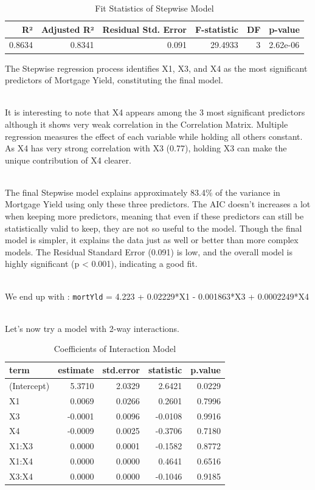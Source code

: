 \documentclass[
  11pt,
]{article}
\begin{document}
\begin{table}[!h]
\centering
\caption{\label{tab:unnamed-chunk-14}Fit Statistics of Stepwise Model}
\centering
\fontsize{8}{10}\selectfont
\begin{tabular}[t]{rrrrrl}
\toprule
R² & Adjusted R² & Residual Std. Error & F-statistic & DF & p-value\\
\midrule
0.8634 & 0.8341 & 0.091 & 29.4933 & 3 & 2.62e-06\\
\bottomrule
\end{tabular}
\end{table}

The Stepwise regression process identifies X1, X3, and X4 as the most
significant predictors of Mortgage Yield, constituting the final
model.\\
\strut \\
It is interesting to note that X4 appears among the 3 most significant
predictors although it shows very weak correlation in the Correlation
Matrix. Multiple regression measures the effect of each variable while
holding all others constant. As X4 has very strong correlation with X3
(0.77), holding X3 can make the unique contribution of X4 clearer.\\
\strut \\
The final Stepwise model explains approximately 83.4\% of the variance
in Mortgage Yield using only these three predictors. The AIC doesn't
increases a lot when keeping more predictors, meaning that even if these
predictors can still be statistically valid to keep, they are not so
useful to the model. Though the final model is simpler, it explains the
data just as well or better than more complex models. The Residual
Standard Error (0.091) is low, and the overall model is highly
significant (p \textless{} 0.001), indicating a good fit.\\
\strut \\
We end up with : \texttt{mortYld} = 4.223 + 0.02229*X1 - 0.001863*X3 +
0.0002249*X4\\
\strut \\
Let's now try a model with 2-way interactions.

\begin{table}[!h]
\centering
\caption{\label{tab:unnamed-chunk-15}Coefficients of Interaction Model}
\centering
\fontsize{8}{10}\selectfont
\begin{tabular}[t]{lrrrr}
\toprule
term & estimate & std.error & statistic & p.value\\
\midrule
(Intercept) & 5.3710 & 2.0329 & 2.6421 & 0.0229\\
X1 & 0.0069 & 0.0266 & 0.2601 & 0.7996\\
X3 & -0.0001 & 0.0096 & -0.0108 & 0.9916\\
X4 & -0.0009 & 0.0025 & -0.3706 & 0.7180\\
X1:X3 & 0.0000 & 0.0001 & -0.1582 & 0.8772\\
\addlinespace
X1:X4 & 0.0000 & 0.0000 & 0.4641 & 0.6516\\
X3:X4 & 0.0000 & 0.0000 & -0.1046 & 0.9185\\
\bottomrule
\end{tabular}
\end{table}
\end{document}
